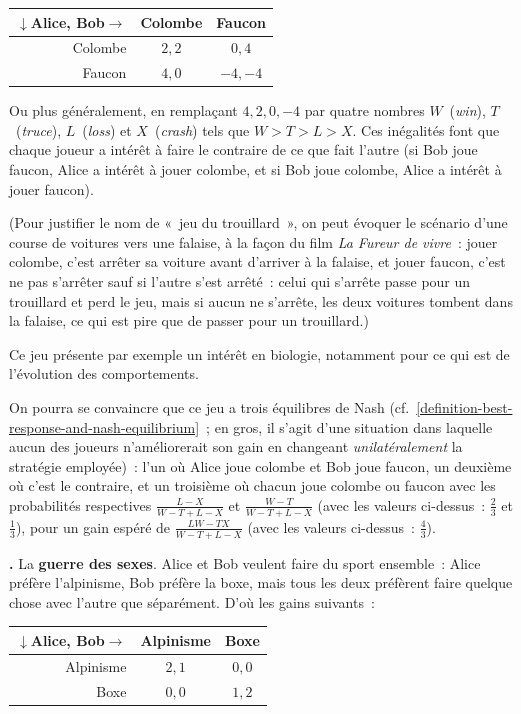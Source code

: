 \documentclass[12pt,a4paper]{article}
\theoremstyle{definition}
\newcommand\thingy{%
\refstepcounter{comcnt}\smallskip\noindent\textbf{\thecomcnt.} }
\newcommand{\defin}[2][]{\def\latexsucks{#1}\ifx\latexsucks\empty\index{#2}\else\index{\latexsucks}\fi\textbf{#2}}
\begin{document}
\begin{center}
\begin{tabular}{r|cc}
$\downarrow$Alice, Bob$\rightarrow$&Colombe&Faucon\\\hline
Colombe&$2,2$&$0,4$\\
Faucon&$4,0$&$-4,-4$\\
\end{tabular}
\end{center}

Ou plus généralement, en remplaçant $4,2,0,-4$ par quatre nombres
$W$ (\textit{win}), $T$ (\textit{truce}), $L$ (\textit{loss}) et
$X$ (\textit{crash}) tels que $W>T>L>X$.  Ces inégalités font que
chaque joueur a intérêt à faire le contraire de ce que fait l'autre
(si Bob joue faucon, Alice a intérêt à jouer colombe, et si Bob joue
colombe, Alice a intérêt à jouer faucon).

(Pour justifier le nom de « jeu du trouillard », on peut évoquer le
scénario d'une course de voitures vers une falaise, à la façon du film
\textit{La Fureur de vivre} : jouer colombe, c'est arrêter sa voiture
avant d'arriver à la falaise, et jouer faucon, c'est ne pas s'arrêter
sauf si l'autre s'est arrêté : celui qui s'arrête passe pour un
trouillard et perd le jeu, mais si aucun ne s'arrête, les deux
voitures tombent dans la falaise, ce qui est pire que de passer pour
un trouillard.)

Ce jeu présente par exemple un intérêt en biologie, notamment pour ce
qui est de l'évolution des comportements.

On pourra se convaincre que ce jeu a trois équilibres de Nash
(cf. \ref{definition-best-response-and-nash-equilibrium} ; en gros, il
s'agit d'une situation dans laquelle aucun des joueurs n'améliorerait
son gain en changeant \emph{unilatéralement} la stratégie employée) :
l'un où Alice joue colombe et Bob joue faucon, un deuxième où c'est le
contraire, et un troisième où chacun joue colombe ou faucon avec les
probabilités respectives $\frac{L-X}{W-T + L-X}$ et $\frac{W-T}{W-T +
  L-X}$ (avec les valeurs ci-dessus : $\frac{2}{3}$ et
$\frac{1}{3}$), pour un gain espéré de $\frac{LW - TX}{W-T + L-X}$
(avec les valeurs ci-dessus : $\frac{4}{3}$).

\thingy\label{battle-of-sexes} La \defin{guerre des sexes}.  Alice et
Bob veulent faire du sport ensemble : Alice préfère l'alpinisme, Bob
préfère la boxe, mais tous les deux préfèrent faire quelque chose avec
l'autre que séparément.  D'où les gains suivants :

\begin{center}
\begin{tabular}{r|cc}
$\downarrow$Alice, Bob$\rightarrow$&Alpinisme&Boxe\\\hline
Alpinisme&$2,1$&$0,0$\\
Boxe&$0,0$&$1,2$\\
\end{tabular}
\end{center}
\end{document}
